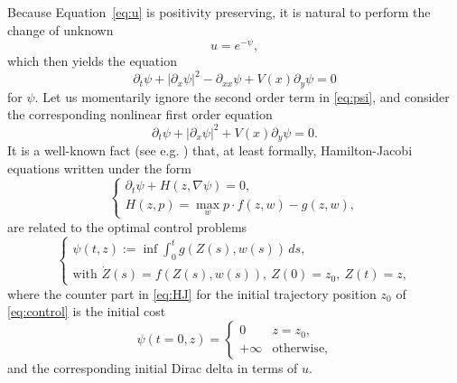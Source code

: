 \documentclass[12pt]{article}
\begin{document}
Because Equation~\eqref{eq:u} is positivity preserving, it is natural to 
perform the change of unknown 
\begin{equation}\label{def:psi}
u = e^{-\psi},
\end{equation}
which then yields the equation
\begin{equation}\label{eq:psi}
\partial_t \psi + |\partial_x \psi|^2 - \partial_{xx}\psi +
V(x)\partial_y \psi = 0
\end{equation}
for $\psi.$ Let us momentarily ignore the second order term in \eqref{eq:psi}, 
and consider the corresponding nonlinear first order equation 
\begin{equation}\label{eq:psibis}
\partial_t \psi + |\partial_x \psi|^2 +
V(x)\partial_y \psi = 0.
\end{equation}
It is a well-known fact (see e.g. \cite{PonBoGaMi62}) that, at least formally, 
Hamilton-Jacobi equations written under the form
\begin{equation}\label{eq:HJ}
\left\{
\begin{array}{l}
\partial_t \psi + H(z, \nabla \psi) = 0,\\
H(z, p) = \max_w p\cdot f(z,w) - g(z, w),
\end{array}\right.
\end{equation}
are related to the optimal control problems
\begin{equation}\label{eq:control}
\left\{
\begin{array}{l}
\psi(t,z) := \inf \int_0^t g(Z(s), w(s))\, ds,\\
\text{with } \dot{Z}(s) = f(Z(s), w(s)),\ Z(0) = z_0,\ Z(t) = z,
\end{array}\right.
\end{equation}
where the counter part in \eqref{eq:HJ} for the initial trajectory position $z_0$ of 
\eqref{eq:control} is the initial cost
\begin{equation*}
\psi(t=0,z)=\left\{
\begin{array}{ll}
0 & z=z_0,\\
+\infty& \text{otherwise,}
\end{array}\right.
\end{equation*} and the corresponding initial Dirac delta in terms of $u$.
\end{document}
